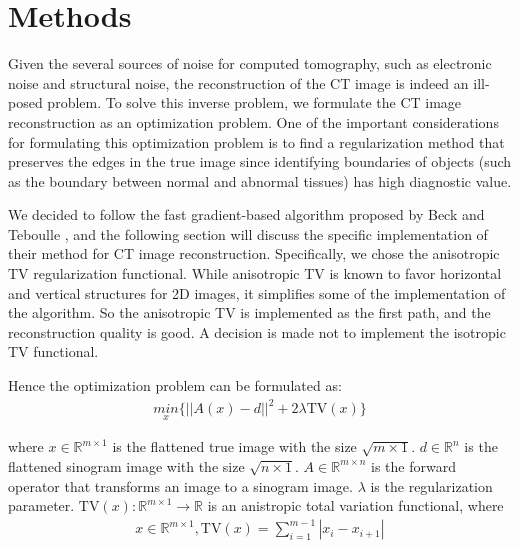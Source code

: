 \documentclass[12pt]{article}
\newcommand{\noin}{\noindent}
\begin{document}
\section{Methods}

\noin Given the several sources of noise for computed tomography\cite{Duan2013-mi}, such as electronic noise and structural noise, the reconstruction of the CT image is indeed an ill-posed problem. To solve this inverse problem, we formulate the CT image reconstruction as an optimization problem. One of the important considerations for formulating this optimization problem is to find a regularization method that preserves the edges in the true image since identifying boundaries of objects (such as the boundary between normal and abnormal tissues) has high diagnostic value.

\vspace{0.2in}

\noin We decided to follow the fast gradient-based algorithm proposed by Beck and Teboulle \cite{Beck2009-id}, and the following section will discuss the specific implementation of their method for CT image reconstruction. Specifically, we chose the anisotropic TV regularization functional. While anisotropic TV is known to favor horizontal and vertical structures for 2D images\cite{Condat2017-uj}, it simplifies some of the implementation of the algorithm. So the anisotropic TV is implemented as the first path, and the reconstruction quality is good. A decision is made not to implement the isotropic TV functional. 

\vspace{0.2in}

\noin Hence the optimization problem can be formulated as:
\begin{align}
 \underset{x}{min}\{ ||A(x) - d||^2 + 2 \lambda\text{TV}(x)\} \label{eq1}
\end{align}

\noin where
$x \in \mathbb{R}^{m \times 1}$ is the flattened true image with the size $\sqrt{m \times 1}$.
$d \in \mathbb{R}^n$ is the flattened sinogram image with the size $\sqrt{n \times 1}$.
$A \in \mathbb{R}^{m \times n}$ is the forward operator that transforms an image to a sinogram image.
$\lambda$ is the regularization parameter. 
$\text{TV}(x): \mathbb{R}^{m\times 1} \rightarrow \mathbb{R}$  is an anistropic total variation functional, where 
\begin{align}
    x \in \mathbb{R}^{m\times 1}, \text{TV}(x) = \sum_{i=1}^{m-1}{|x_i - x_{i+1}|} 
\end{align}
\end{document}

